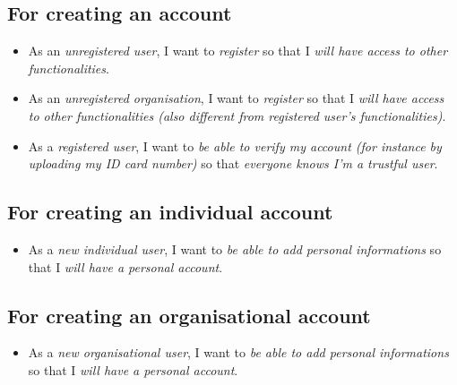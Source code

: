 \subsection{For creating an account}
\begin{itemize}
    \item As an \textit{unregistered user}, I want to \textit{register} so that I \textit{will have access to other functionalities}.
    \item As an \textit{unregistered organisation}, I want to \textit{register} so that I \textit{will have access to other functionalities (also different from registered user's functionalities)}.
    \item As a \textit{registered user}, I want to \textit{be able to verify my account (for instance by uploading my ID card number)} so that \textit{everyone knows I'm a trustful user}.
\end{itemize}


\subsection{For creating an individual account}
\begin{itemize}
    \item As a \textit{new individual user}, I want to \textit{be able to add personal informations} so that I \textit{will have a personal account}.
\end{itemize}

\subsection{For creating an organisational account}
\begin{itemize}
    \item As a \textit{new organisational user}, I want to \textit{be able to add personal informations} so that I \textit{will have a personal account}.
\end{itemize}

